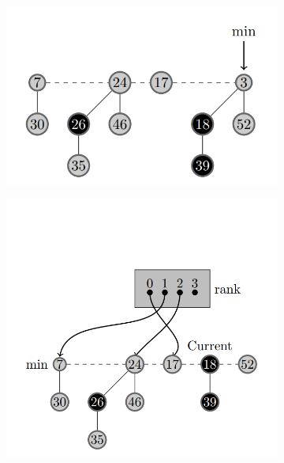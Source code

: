 \documentclass[14pt,a4paper]{report}
\begin{document}
\begin{figure}[H]
    \begin{subfigure}[H]{0.4\linewidth}

         \includegraphics[width=\textwidth]{e1.png}
         \caption{}
         \label{fig:e1}
     \end{subfigure}
     \hspace*{\fill}
    \begin{subfigure}[H]{0.5\linewidth}
         \centering
         \includegraphics[width=\textwidth]{e2.png}
         \caption{}
         \label{fig:e2}
     \end{subfigure}

\end{figure}
\end{document}

